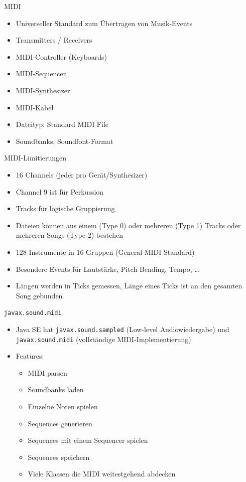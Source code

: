 \documentclass[presentation]{beamer}
\begin{document}
\begin{frame}[label=sec-2-1]{MIDI}
\begin{itemize}
\item Universeller Standard zum Übertragen von Musik-Events
\item Transmitters / Receivers
\item MIDI-Controller (Keyboards)
\item MIDI-Sequencer
\item MIDI-Synthesizer
\item MIDI-Kabel
\item Dateityp: Standard MIDI File
\item Soundbanks, Soundfont-Format
\end{itemize}
\end{frame}

\begin{frame}[label=sec-2-2]{MIDI-Limitierungen}
\begin{itemize}
\item 16 Channels (jeder pro Gerät/Synthesizer)
\item Channel 9 ist für Perkussion
\item Tracks für logische Gruppierung
\item Dateien können aus einem (Type 0) oder mehreren (Type 1) Tracks
oder mehreren Songs (Type 2) bestehen
\item 128 Instrumente in 16 Gruppen (General MIDI Standard)
\item Besondere Events für Lautstärke, Pitch Bending, Tempo, \ldots{}
\item Längen werden in Ticks gemessen, Länge eines Ticks ist an den
gesamten Song gebunden
\end{itemize}
\end{frame}

\begin{frame}[fragile,label=sec-2-3]{\texttt{javax.sound.midi}}
 \begin{itemize}
\item Java SE hat \texttt{javax.sound.sampled} (Low-level Audiowiedergabe) und
\texttt{javax.sound.midi} (vollständige MIDI-Implementierung)
\item Features:
\begin{itemize}
\item MIDI parsen
\item Soundbanks laden
\item Einzelne Noten spielen
\item Sequences generieren
\item Sequences mit einem Sequencer spielen
\item Sequences speichern
\item Viele Klassen die MIDI weitestgehend abdecken
\end{itemize}
\end{itemize}
\end{frame}
\end{document}
